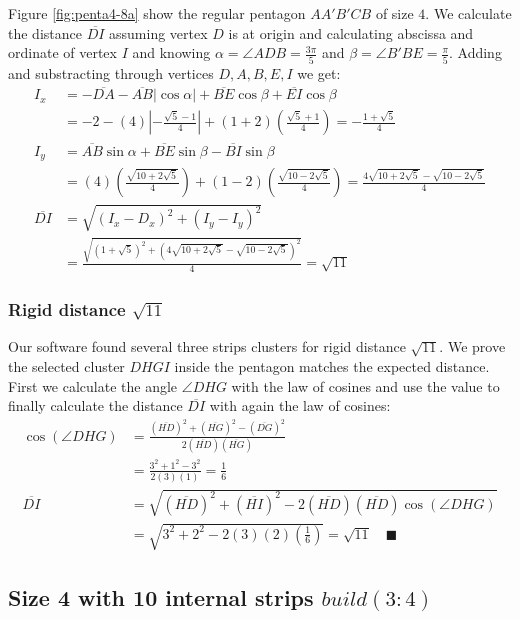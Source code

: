\documentclass[11pt]{article}
\begin{document}
Figure \ref{fig:penta4-8a} show the regular pentagon $AA'B'CB$ of size $4$. We calculate the distance $\overline{DI}$ assuming vertex $D$ is at origin and calculating abscissa and ordinate of vertex $I$ and knowing $\alpha = \angle{ADB} = \frac{3\pi}5$ and $\beta = \angle{B'BE} = \frac{\pi}5$. Adding and substracting through vertices $D,A,B,E,I$ we get:
\begin{align}
I_x &= -\overline{DA} - \overline{AB}|\cos\alpha| + \overline{BE}\cos\beta + \overline{EI}\cos\beta \nonumber\\
 &= -2 -(4)\left|-\frac{\sqrt5 - 1}4\right| + (1+2)\left(\frac{\sqrt5+1}4\right)
 = -\frac{1+\sqrt5}4 \\
I_y &= \overline{AB}\sin\alpha + \overline{BE}\sin\beta - \overline{BI}\sin\beta \nonumber\\
 &= (4)\left(\frac{\sqrt{10+2\sqrt5}}4\right) + (1-2)\left(\frac{\sqrt{10-2\sqrt5}}4\right)
 = \frac{4\sqrt{10+2\sqrt5} - \sqrt{10-2\sqrt5}}4 \\
%
\overline{DI} &= \sqrt{(I_x - D_x)^2 + (I_y - I_y)^2} \nonumber\\
 &= \frac{\sqrt{(1+\sqrt5)^2 + (4\sqrt{10+2\sqrt5} - \sqrt{10-2\sqrt5})^2}}4
 = \sqrt{11}
\end{align}

\subsubsection{Rigid distance $\sqrt{11}$}

Our software found several three strips clusters for rigid distance $\sqrt{11}$. We prove the selected cluster $DHGI$ inside the pentagon matches the expected distance. First we calculate the angle $\angle{DHG}$ with the law of cosines and use the value to finally calculate the distance $\overline{DI}$ with again the law of cosines:
\begin{align}
\cos(\angle{DHG}) &= \frac{(\overline{HD})^2 + (\overline{HG})^2 - (\overline{DG})^2}
 {2(\overline{HD})(\overline{HG})} \nonumber\\
 &= \frac{3^2 + 1^2 - 3^2}{2(3)(1)} = \frac{1}6 \\
\overline{DI} &= \sqrt{(\overline{HD})^2 + (\overline{HI})^2
 - 2(\overline{HD})(\overline{HD})\cos(\angle{DHG})} \nonumber\\
 &= \sqrt{3^2 + 2^2 - 2(3)(2)\left(\frac{1}6\right)} = \sqrt{11} \quad\blacksquare
\end{align}

\subsection{Size 4 with 10 internal strips $build(3:4)$}
\end{document}
